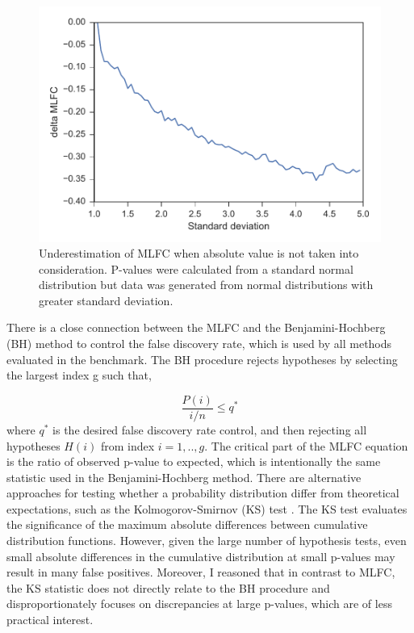 \begin{figure}
  \centering
  \makeatletter
  \let\@currsize\normalsize
  \includegraphics[width=0.9\linewidth]{figures/chapter4/delta_mlfc.pdf}
  \caption[Effect of absolute value on MLFC]{Underestimation of MLFC when absolute value is not taken into consideration. P-values were calculated from a standard normal distribution but data was generated from normal distributions with greater standard deviation.}
  \label{fig:mlfc_diff}
\end{figure}

There is a close connection between the MLFC and the Benjamini-Hochberg (BH) method \cite{RN94} to control the false discovery rate, which is used by all methods evaluated in the benchmark. The BH procedure rejects hypotheses by selecting the largest index g such that,

\begin{equation}
\frac{P(i)}{i/n} \leq q^*
\end{equation}
where $q^*$ is the desired false discovery rate control, and then rejecting all hypotheses $H(i)$ from index $i=1,..,g$. The critical part of the MLFC equation is the ratio of observed p-value to expected, which is intentionally the same statistic used in the Benjamini-Hochberg method. There are alternative approaches for testing whether a probability distribution differ from theoretical expectations, such as the Kolmogorov-Smirnov (KS) test \cite{RN100}. The KS test evaluates the significance of the maximum absolute differences between cumulative distribution functions. However, given the large number of hypothesis tests, even small absolute differences in the cumulative distribution at small p-values may result in many false positives. Moreover, I reasoned that in contrast to MLFC, the KS statistic does not directly relate to the BH procedure and disproportionately focuses on discrepancies at large p-values, which are of less practical interest.

